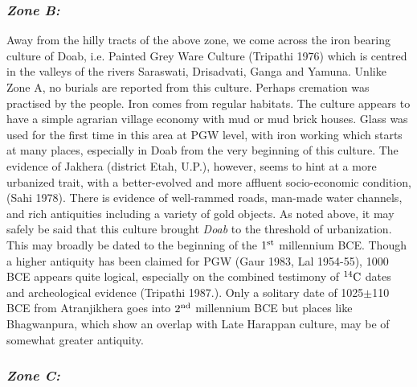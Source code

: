 \vspace{-.4cm}

\subsubsection*{\textit{Zone B:}}

\vspace{-.2cm}

Away from the hilly tracts of the above zone, we come across the iron bearing culture of Doab, i.e. Painted Grey Ware Culture (Tripathi 1976) which is centred in the valleys of the rivers Saraswati, Drisadvati, Ganga and Yamuna. Unlike Zone A, no burials are reported from this culture. Perhaps cremation was practised by the people. Iron comes from regular habitats. The culture appears to have a simple agrarian village economy with mud or mud brick houses. Glass was used for the first time in this area at PGW level, with iron working which starts at many places, especially in Doab from the very beginning of this culture. The evidence of Jakhera (district Etah, U.P.), however, seems to hint at a more urbanized trait, with a better-evolved and more affluent socio-economic condition, (Sahi 1978). There is evidence of well-rammed roads, man-made water channels, and rich antiquities including a variety of gold objects. As noted above, it may safely be said that this culture brought \textit{Doab} to the threshold of urbanization. This may broadly be dated to the beginning of the $1^{\rm st}$ millennium BCE. Though a higher antiquity has been claimed for PGW (Gaur 1983, Lal 1954-55), 1000 BCE appears quite logical, especially on the combined testimony of $^{14}{\rm C}$ dates and archeological evidence (Tripathi 1987.). Only a solitary date of 1025$\pm$110 BCE from Atranjikhera goes into $2^{\rm nd}$ millennium BCE but places like Bhagwanpura, which show an overlap with Late Harappan culture, may be of somewhat greater antiquity.

\newpage
\vspace{-.3cm}

\subsubsection*{\textit{Zone C:}}

\vspace{-.2cm}

